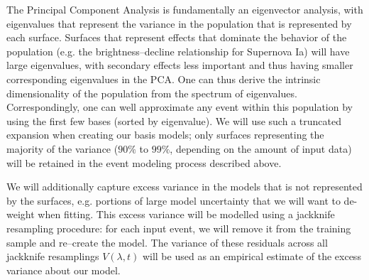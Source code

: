  The Principal Component
Analysis is fundamentally an eigenvector analysis, with eigenvalues that
represent the variance in the population that is represented by each surface.
Surfaces that represent effects that dominate the behavior of the population
(e.g. the brightness--decline relationship for Supernova Ia) will have large
eigenvalues, with secondary effects less important and thus having smaller
corresponding eigenvalues in the PCA.  One can thus derive the intrinsic
dimensionality of the population from the spectrum of eigenvalues.
Correspondingly, one can well approximate any event within this population by
using the first few bases (sorted by eigenvalue).  We will use such a truncated
expansion when creating our basis models; only surfaces representing the
majority of the variance ($90\%$ to $99\%$, depending on the amount of input
data) will be retained in the event modeling process described above.

 We will additionally capture
excess variance in the models that is not represented by the surfaces, e.g.
portions of large model uncertainty that we will want to de-weight when fitting.
This excess variance will be modelled using a jackknife resampling procedure:
for each input event, we will remove it from the training sample and re--create
the model.  The variance of these residuals across all jackknife resamplings
$V(\lambda, t)$ will be used as an empirical estimate of the excess variance
about our model.  

